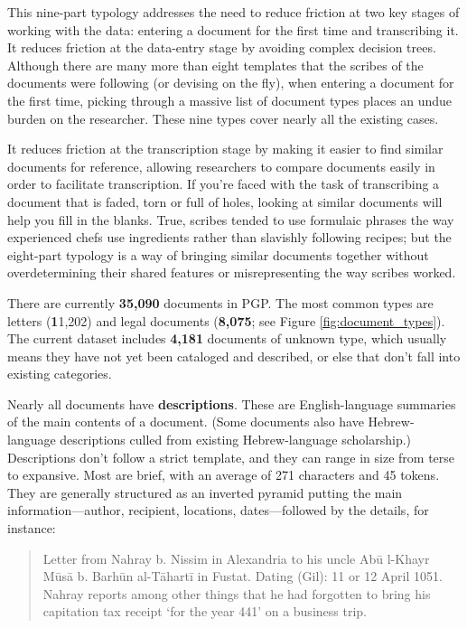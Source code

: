 \documentclass{article}
\def\totalDocuments{35,090}
\def\totalLetter{11,202}
\def\totalLegalDocument{8,075}
\def\totalUnknown{4,181}
\begin{document}
This nine-part typology addresses the need to reduce friction at two key stages of working with the data: entering a document for the first time and transcribing it. It reduces friction at the data-entry stage by avoiding complex decision trees. Although there are many more than eight templates that the scribes of the documents were following (or devising on the fly), when entering a document for the first time, picking through a massive list of document types places an undue burden on the researcher. These nine types cover nearly all the existing cases. 

It reduces friction at the transcription stage by making it easier to find similar documents for reference, allowing researchers to compare documents easily in order to facilitate transcription. If you’re faced with the task of transcribing a document that is faded, torn or full of holes, looking at similar documents will help you fill in the blanks. True, scribes tended to use formulaic phrases the way experienced chefs use ingredients rather than slavishly following recipes; but the eight-part typology is a way of bringing similar documents together without overdetermining their shared features or misrepresenting the way scribes worked.

There are currently \textbf{\totalDocuments} documents in PGP. The most common types are letters (\textbf\totalLetter) and legal documents (\textbf{\totalLegalDocument}; see Figure \ref{fig:document_types}). The current dataset includes \textbf{\totalUnknown} documents of unknown type, which usually means they have not yet been cataloged and described, or else that don’t fall into existing categories. 

Nearly all documents have \textbf{descriptions}. These are English-language summaries of the main contents of a document. (Some documents also have Hebrew-language descriptions culled from existing Hebrew-language scholarship.) Descriptions don’t follow a strict template, and they can range in size from terse to expansive. Most are brief, with an average of 271 characters and 45 tokens. They are generally structured as an inverted pyramid putting the main information—author, recipient, locations, dates—followed by the details, for instance: 

\begin{quote}
Letter from Nahray b. Nissim in Alexandria to his uncle Abū l-Khayr Mūsā b. Barhūn al-Tāhartī in Fustat. Dating (Gil): 11 or 12 April 1051. Nahray reports among other things that he had forgotten to bring his capitation tax receipt ‘for the year 441’ on a business trip. \autocite{noauthor_letter_1050}
\end{quote}
\end{document}
